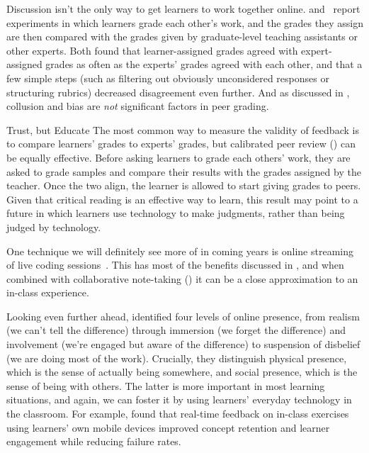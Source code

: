 Discussion isn't the only way to get learners to work together online.
\cite{Pare2008} and~\cite{Kulk2013} report experiments
in which learners grade each other's work,
and the grades they assign are then compared with
the grades given by graduate-level teaching assistants or other experts.
Both found that learner-assigned grades agreed with expert-assigned grades
as often as the experts' grades agreed with each other,
and that a few simple steps
(such as filtering out obviously unconsidered responses or structuring rubrics)
decreased disagreement even further.
And as discussed in ,
collusion and bias are \emph{not} significant factors in peer grading.

\begin{aside}{Trust, but Educate}
  The most common way to measure the validity of feedback
  is to compare learners' grades to experts' grades,
  but calibrated peer review () can be equally effective.
  Before asking learners to grade each others' work,
  they are asked to grade samples and compare their results with the grades assigned by the teacher.
  Once the two align,
  the learner is allowed to start giving grades to peers.
  Given that critical reading is an effective way to learn,
  this result may point to a future in which learners use technology to make judgments,
  rather than being judged by technology.
\end{aside}

One technique we will definitely see more of in coming years is
online streaming of live coding sessions~\cite{Haar2017}.
This has most of the benefits discussed in ,
and when combined with collaborative note-taking ()
it can be a close approximation to an in-class experience.

Looking even further ahead,
\cite{Ijss2000} identified four levels of online presence,
from realism (we can't tell the difference)
through immersion (we forget the difference)
and involvement (we're engaged but aware of the difference)
to suspension of disbelief (we are doing most of the work).
Crucially,
they distinguish physical presence,
which is the sense of actually being somewhere,
and social presence, which is the sense of being with others.
The latter is more important in most learning situations,
and again,
we can foster it by using learners' everyday technology in the classroom.
For example,
\cite{Deb2018} found that real-time feedback on in-class exercises
using learners' own mobile devices
improved concept retention and learner engagement while reducing failure rates.

